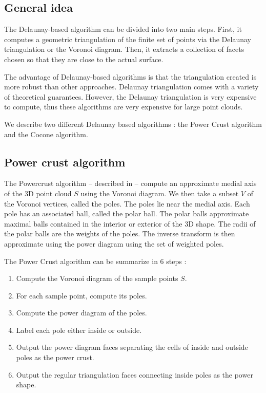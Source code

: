 \documentclass[12pt]{article}
\begin{document}
\subsection{General idea}
The Delaunay-based algorithm can be divided into two main steps. First, it computes a geometric triangulation of the finite set of points via the Delaunay triangulation or the Voronoi diagram. Then, it extracts a collection of facets chosen so that they are close to the actual surface.

The advantage of Delaunay-based algorithms is that the triangulation created is more robust than other approaches. Delaunay triangulation comes with a variety of theoretical guarantees. However, the Delaunay triangulation is very expensive to compute, thus these algorithms are very expensive for large point clouds.

We describe two different Delaunay based algorithms : the Power Crust algorithm and the Cocone algorithm.

\subsection{Power crust algorithm}
\label{subsec:pca}
The Powercrust algorithm -- described in \cite{Powercrust}-- compute an approximate medial axis of the 3D point cloud $S$ using the Voronoi diagram. We then take a subset $V$ of the Voronoi vertices, called the poles. The poles lie near the medial axis. Each pole has an associated ball, called the polar ball. The polar balls approximate maximal balls contained in the interior or exterior of the 3D shape. The radii of the polar balls are the weights of the poles. The inverse transform is then approximate using the power diagram using the set of weighted poles.

The Power Crust algorithm can be summarize in 6 steps :
\begin{enumerate}
\item Compute the Voronoi diagram of the sample points $S$.
\item For each sample point, compute its poles.
\item Compute the power diagram of the poles.
\item Label each pole either inside or outside.
\item Output the power diagram faces separating the cells of inside and outside poles as the power crust.
\item Output the regular triangulation faces connecting inside poles as the power shape.
\end{enumerate}
\end{document}
